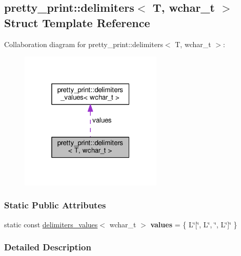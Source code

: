 \hypertarget{structpretty__print_1_1delimiters_3_01T_00_01wchar__t_01_4}{}\subsection{pretty\+\_\+print\+:\+:delimiters$<$ T, wchar\+\_\+t $>$ Struct Template Reference}
\label{structpretty__print_1_1delimiters_3_01T_00_01wchar__t_01_4}


Collaboration diagram for pretty\+\_\+print\+:\+:delimiters$<$ T, wchar\+\_\+t $>$\+:\nopagebreak
\begin{figure}[H]
\begin{center}
\leavevmode
\includegraphics[width=193pt]{structpretty__print_1_1delimiters_3_01T_00_01wchar__t_01_4__coll__graph}
\end{center}
\end{figure}
\subsubsection*{Static Public Attributes}
\begin{DoxyCompactItemize}
\item 
static const \hyperlink{structpretty__print_1_1delimiters__values}{delimiters\+\_\+values}$<$ wchar\+\_\+t $>$ {\bfseries values} = \{ L\char`\"{}\mbox{[}\char`\"{}, L\char`\"{}, \char`\"{}, L\char`\"{}\mbox{]}\char`\"{} \}\hypertarget{structpretty__print_1_1delimiters_3_01T_00_01wchar__t_01_4_a4b83433a6047add4a451e0048b08216c}{}\label{structpretty__print_1_1delimiters_3_01T_00_01wchar__t_01_4_a4b83433a6047add4a451e0048b08216c}

\end{DoxyCompactItemize}


\subsubsection{Detailed Description}
